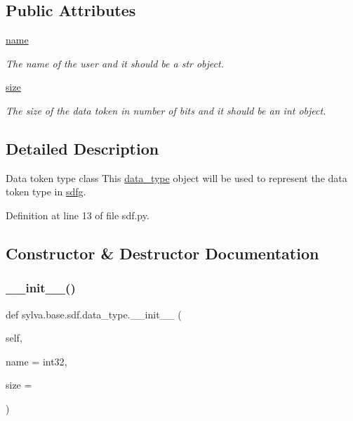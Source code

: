 \subsection*{Public Attributes}
\begin{DoxyCompactItemize}
\item 
\hyperlink{classsylva_1_1base_1_1sdf_1_1data__type_a5bb984de0211b07ac2a1a882ff7b1744}{name}
\begin{DoxyCompactList}\small\item\em The name of the user and it should be a str object. \end{DoxyCompactList}\item 
\hyperlink{classsylva_1_1base_1_1sdf_1_1data__type_a76a0420d9704afe37b25895b906128b3}{size}
\begin{DoxyCompactList}\small\item\em The size of the data token in number of bits and it should be an int object. \end{DoxyCompactList}\end{DoxyCompactItemize}


\subsection{Detailed Description}
Data token type class This \hyperlink{classsylva_1_1base_1_1sdf_1_1data__type}{data\+\_\+type} object will be used to represent the data token type in \hyperlink{classsylva_1_1base_1_1sdf_1_1sdfg}{sdfg}. 



Definition at line 13 of file sdf.\+py.



\subsection{Constructor \& Destructor Documentation}
\mbox{\label{classsylva_1_1base_1_1sdf_1_1data__type_a67a4e99823bb60e42cbcefa96230a46d}} 
\subsubsection{\texorpdfstring{\+\_\+\+\_\+init\+\_\+\+\_\+()}{\_\_init\_\_()}}
{\footnotesize\ttfamily def sylva.\+base.\+sdf.\+data\+\_\+type.\+\_\+\+\_\+init\+\_\+\+\_\+ (\begin{DoxyParamCaption}\item[{}]{self,  }\item[{}]{name = {\ttfamily \textquotesingle{}int32\textquotesingle{}},  }\item[{}]{size = {} }\end{DoxyParamCaption})}



